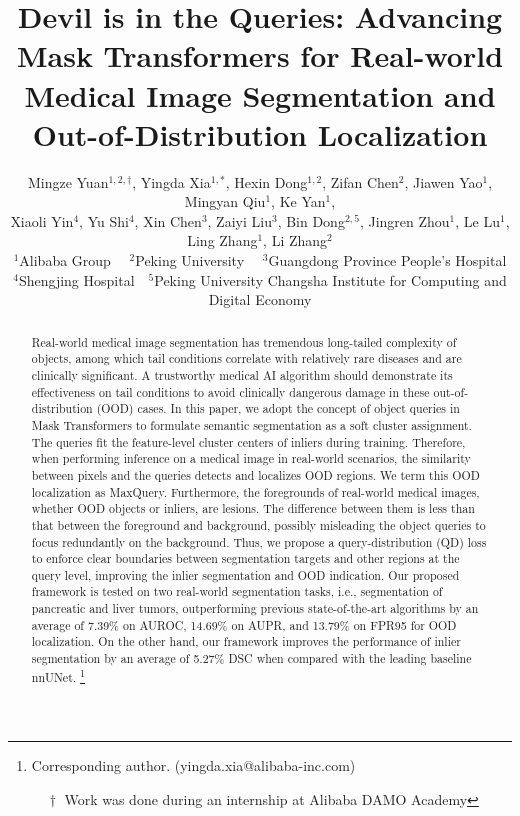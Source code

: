 \documentclass[10pt,twocolumn,letterpaper]{article}
\begin{document}
\title{Devil is in the Queries: Advancing Mask Transformers for Real-world Medical Image Segmentation and Out-of-Distribution Localization}
\author{
Mingze Yuan$^{1,2,\dagger}$, Yingda Xia$^{1, *}$, Hexin Dong$^{1,2}$, Zifan Chen$^{2}$, Jiawen Yao$^{1}$, Mingyan Qiu$^{1}$, Ke Yan$^{1}$, \\
Xiaoli Yin$^{4}$, Yu Shi$^{4}$, Xin Chen$^{3}$, Zaiyi Liu$^{3}$, Bin Dong$^{2,5}$, Jingren Zhou$^{1}$, Le Lu$^{1}$, Ling Zhang$^{1}$, Li Zhang$^{2}$ \\
$^{1}$Alibaba Group \,\,\,\,
$^{2}$Peking University \,\,\,\,
$^{3}$Guangdong Province People's Hospital \\
$^{4}$Shengjing Hospital\,\,\,\,
$^{5}$Peking University Changsha Institute for Computing and Digital Economy 
}

\maketitle

\begin{abstract}
Real-world medical image segmentation has tremendous long-tailed complexity of objects, among which tail conditions correlate with relatively rare diseases and are clinically significant. A trustworthy medical AI algorithm should demonstrate its effectiveness on tail conditions to avoid clinically dangerous damage in these out-of-distribution (OOD) cases. In this paper, we adopt the concept of object queries in Mask Transformers to formulate semantic segmentation as a soft cluster assignment. The queries fit the feature-level cluster centers of inliers during training. Therefore, when performing inference on a medical image in real-world scenarios, the similarity between pixels and the queries detects and localizes OOD regions. We term this OOD localization as MaxQuery. Furthermore, the foregrounds of real-world medical images, whether OOD objects or inliers, are lesions. The difference between them is less than that between the foreground and background, possibly misleading the object queries to focus redundantly on the background. Thus, we propose a query-distribution (QD) loss to enforce clear boundaries between segmentation targets and other regions at the query level, improving the inlier segmentation and OOD indication. Our proposed framework is tested on two real-world segmentation tasks, i.e., segmentation of pancreatic and liver tumors, outperforming previous state-of-the-art algorithms by an average of 7.39\% on AUROC, 14.69\% on AUPR, and 13.79\% on FPR95 for OOD localization. On the other hand, our framework improves the performance of inlier segmentation by an average of 5.27\% DSC when compared with the leading baseline nnUNet.
\let\thefootnote\relax\footnote{\text{*} Corresponding author. (yingda.xia@alibaba-inc.com)

$\quad \dagger$ Work was done during an internship at Alibaba DAMO Academy}
\end{abstract}
\vspace{-5mm}
\end{document}
